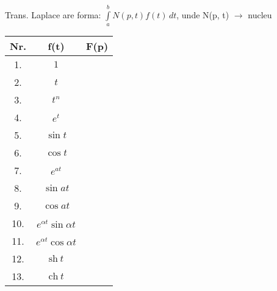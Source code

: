 \documentclass{article}
\begin{document}
\setlength{\extrarowheight}{10pt}

\noindent

Trans. Laplace are forma: $\displaystyle\int\limits_{a}^{b} N(p, t) f(t)\,dt$, unde N(p, t) $\rightarrow$ nucleu\\
\hspace*{-3cm} %
\begin{minipage}{\dimexpr\textwidth+2cm}
  \begin{tabular}{|c|c|c|}
    \hline
    \textbf{Nr.} & \textbf{f(t)}                  & \textbf{F(p)} \\
    \hline
    1.           & $ 1 $                          & $  $          \\
    \hline
    2.           & $ t $                          & $  $          \\
    \hline
    3.           & $ t^n $                        & $  $          \\
    \hline
    4.           & $ e^t $                        & $  $          \\
    \hline
    5.           & $ \sin t $                     & $  $          \\
    \hline
    6.           & $ \cos t $                     & $  $          \\
    \hline
    7.           & $ e^{at} $                     & $  $          \\
    \hline
    8.           & $ \sin at $                    & $  $          \\
    \hline
    9.           & $ \cos at $                    & $  $          \\
    \hline
    10.          & $ e^{\alpha t} \sin \alpha t $ & $  $          \\
    \hline
    11.          & $ e^{\alpha t} \cos \alpha t $ & $  $          \\
    \hline
    12.          & $ \text{sh}\ t $               & $  $          \\
    \hline
    13.          & $ \text{ch}\ t $               & $  $          \\
    \hline
  \end{tabular}

\end{minipage}
\end{document}
